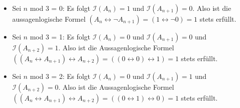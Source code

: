 \documentclass[a4paper,10pt]{article}
\begin{document}
\begin{compactenum}[(a)]
\begin{itemize}
			\item Sei $n$ mod 3 = 0: Es folgt $ \mathcal{I}(A_n)=1 $ und $ \mathcal{I}(A_{n+1})=0 $. Also ist die aussagenlogische Formel $(A_n \leftrightarrow \lnot A_{n+1}) = (1 \leftrightarrow \lnot 0) = 1$ stets erfüllt.
			\item Sei $n$ mod 3 = 1: Es folgt $ \mathcal{I}(A_n)=0 $ und $ \mathcal{I}(A_{n+1})=0 $ und $ \mathcal{I}(A_{n+2})=1 $. Also ist die Aussagenlogische Formel $ ((A_n \leftrightarrow A_{n+1}) \leftrightarrow A_{n+2}) = ((0 \leftrightarrow 0) \leftrightarrow 1) = 1 $ stets erfüllt.
			\item Sei $n$ mod 3 = 2: Es folgt $ \mathcal{I}(A_n)=0 $ und $ \mathcal{I}(A_{n+1})=1 $ und $ \mathcal{I}(A_{n+2})=0 $. Also ist die Aussagenlogische Formel $ ((A_n \leftrightarrow A_{n+1}) \leftrightarrow A_{n+2}) = ((0 \leftrightarrow 1) \leftrightarrow 0) = 1 $ stets erfüllt.
		\end{itemize}
	\end{compactenum}
	
	\newpage
	
\end{document}
